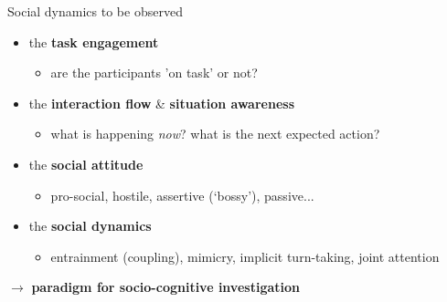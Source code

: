 \documentclass[xcolor=table]{beamer}
\begin{document}




\begin{frame}{Social dynamics to be observed}

    \begin{itemize}
        \item<+-> the \textbf{task engagement}
            \begin{itemize}
                \item are the participants 'on task' or not?
            \end{itemize}
        \item<+-> the \textbf{interaction flow} \& \textbf{situation awareness}
            \begin{itemize}
                \item what is happening \emph{now}? what is the next expected
                    action?
            \end{itemize}
        \item<+-> the \textbf{social attitude}
            \begin{itemize}
                \item pro-social, hostile, assertive (‘bossy’), passive...
            \end{itemize}
        \item<+-> the \textbf{social dynamics}
            \begin{itemize}
                \item entrainment (coupling), mimicry, implicit turn-taking, joint
                    attention
            \end{itemize}
    \end{itemize}

    \pause
    $\rightarrow$ {\bf paradigm for socio-cognitive investigation}
\end{frame}
\end{document}
